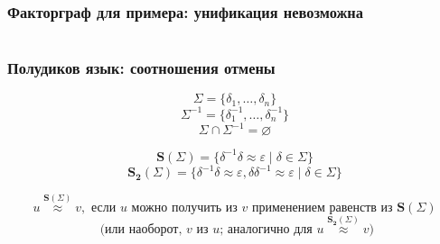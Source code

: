\documentclass{beamer}
\begin{document}
\begin{frame}[fragile]
  \frametitle{Факторграф для примера: унификация невозможна}

  \begin{columns}
    \begin{column}{0.3\textwidth}
        
    \end{column}
    \begin{column}{0.7\textwidth}
      \begin{center}
        
      \end{center}
    \end{column}
    \end{columns}
\end{frame}

\begin{frame}[fragile]
  \frametitle{Полудиков язык: соотношения отмены}
\[
  \Sigma = \{\delta_1, \dots, \delta_n \}
\]
\[
  \Sigma^{-1} = \{\delta_1^{-1}, \dots, \delta_n^{-1} \}
\]
\[
  \Sigma \cap \Sigma^{-1} = \varnothing
\]

\[
  \bm{S}(\Sigma) = \{\delta^{-1} \delta \approx \varepsilon \mid \delta \in \Sigma \}
\]
\[
  \bm{S_2}(\Sigma) = \{\delta^{-1} \delta \approx \varepsilon, \delta \delta^{-1} \approx \varepsilon \mid \delta \in \Sigma \}
\]

\[
  u \stackrel{\bm{S}(\Sigma)}{\approx} v, \text{ если } u \text{ можно получить из } v \text{ применением равенств из } \bm{S}(\Sigma)
\]
\[
  \text{ (или наоборот, } v \text{ из } u \text{; аналогично для } u \stackrel{\bm{S_2}(\Sigma)}{\approx} v)
\]
\end{frame}
\end{document}
